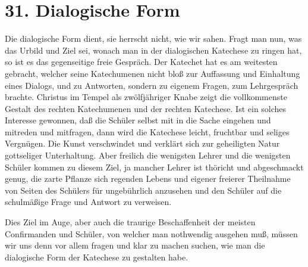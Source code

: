 \section{31. Dialogische Form}

Die dialogische Form dient, sie herrscht nicht, wie wir sahen. Fragt man nun, was das Urbild und Ziel sei, wonach man in der dialogischen Katechese zu ringen hat, so ist es das gegenseitige freie Gespräch. Der Katechet hat es am weitesten gebracht, welcher seine Katechumenen nicht bloß zur Auffassung und Einhaltung eines Dialogs, und zu Antworten, sondern zu eigenem Fragen, zum Lehrgespräch brachte. Christus im Tempel als zwölfjähriger Knabe zeigt die vollkommenste Gestalt des rechten Katechumenen und der rechten Katechese. Ist ein solches Interesse gewonnen, daß die Schüler selbst mit in die Sache eingehen und mitreden und mitfragen, dann wird die Katechese leicht, fruchtbar und seliges Vergnügen. Die Kunst verschwindet und verklärt sich zur geheiligten Natur gottseliger Unterhaltung. Aber freilich die wenigsten Lehrer und die wenigsten Schüler kommen zu diesem Ziel, ja mancher Lehrer ist thöricht und abgeschmackt genug, die zarte Pflanze
sich regenden Lebens und eigener freierer Theilnahme von Seiten des Schülers für ungebührlich anzusehen und den Schüler auf die schulmäßige Frage und Antwort zu verweisen.

Dies Ziel im Auge, aber auch die traurige Beschaffenheit der meisten Confirmanden und Schüler, von welcher man nothwendig ausgehen muß, müssen wir uns denn vor allem fragen und klar zu machen suchen, wie man die dialogische Form der Katechese zu gestalten habe.


